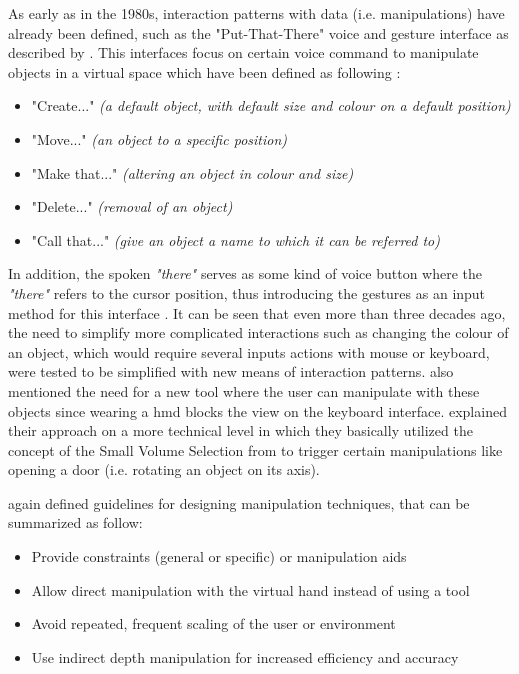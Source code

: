 As early as in the 1980s, interaction patterns with data (i.e. manipulations) have already been defined, such as the "Put-That-There" voice and gesture interface as described by \cite{Bolt1980}. This interfaces focus on certain voice command to manipulate objects in a virtual space which have been defined as following \citep{Bolt1980}:
\begin{itemize}[noitemsep,nolistsep]
	\item "Create..." \textit{(a default object, with default size and colour on a default position)}
	\item "Move..." \textit{(an object to a specific position)}
	\item "Make that..." \textit{(altering an object in colour and size)}
	\item "Delete..." \textit{(removal of an object)}
	\item "Call that..." \textit{(give an object a name to which it can be referred to)}
\end{itemize}
In addition, the spoken \textit{"there"} serves as some kind of voice button where the \textit{"there"} refers to the cursor position, thus introducing the gestures as an input method for this interface \citep{Bolt1980}.
It can be seen that even more than three decades ago, the need to simplify more complicated interactions such as changing the colour of an object, which would require several inputs actions with mouse or keyboard, were tested to be simplified with new means of interaction patterns. \cite{Donalek2014} also mentioned the need for a new tool where the user can manipulate with these objects since wearing a \gls{hmd} blocks the view on the keyboard interface. \newline
\cite{Woodard2015} explained their approach on a more technical level in which they basically utilized the concept of the Small Volume Selection from \cite{Steed2006} to trigger certain manipulations like opening a door (i.e. rotating an object on its axis).

\cite{Bowman2002} again defined guidelines for designing manipulation techniques, that can be summarized as follow:
\begin{itemize}[noitemsep,nolistsep]
	\item Provide constraints (general or specific) or manipulation aids
	\item Allow direct manipulation with the virtual hand instead of using a tool
	\item Avoid repeated, frequent scaling of the user or environment
	\item Use indirect depth manipulation for increased efficiency and accuracy
\end{itemize}

